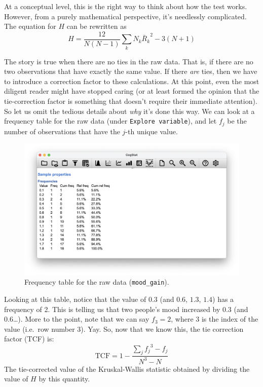 \documentclass[
]{book}
\theoremstyle{definition}
\theoremstyle{definition}
\theoremstyle{definition}
\theoremstyle{definition}
\theoremstyle{remark}
\begin{document}
At a conceptual level, this is the right way to think about how the test works. However, from a purely mathematical perspective, it's needlessly complicated. The equation for \(H\) can be rewritten as
\[
H = \frac{12}{N(N-1)} \sum_k N_k {\bar{R}_k}^2  -  3(N+1)
\]

The story is true when there are no ties in the raw data. That is, if there are no two observations that have exactly the same value. If there \emph{are} ties, then we have to introduce a correction factor to these calculations. At this point, even the most diligent reader might have stopped caring (or at least formed the opinion that the tie-correction factor is something that doesn't require their immediate attention). So let us omit the tedious details about \emph{why} it's done this way. We can look at a frequency table for the raw data (under \texttt{Explore\ variable}), and let \(f_j\) be the number of observations that have the \(j\)-th unique value.



\begin{figure}

{\centering \includegraphics[width=0.66\linewidth]{resources/image/cogstatmoodgainfrequency} 

}

\caption{Frequency table for the raw data (\texttt{mood\_gain}).}\label{fig:moodgainfreq}
\end{figure}

Looking at this table, notice that the value of \(0.3\) (and \(0.6\), \(1.3\), \(1.4\)) has a frequency of 2. This is telling us that two people's mood increased by 0.3 (and 0.6\ldots). More to the point, note that we can say \(f_3 = 2\), where 3 is the index of the value (i.e.~row number 3). Yay. So, now that we know this, the tie correction factor (TCF) is:
\[
\mbox{TCF} = 1 - \frac{\sum_j {f_j}^3 - f_j}{N^3 - N}
\]
The tie-corrected value of the Kruskal-Wallis statistic obtained by dividing the value of \(H\) by this quantity.
\end{document}
